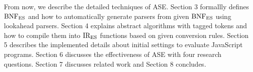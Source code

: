 From now, we describe the detailed techniques of ASE.
Section 3 formallly defines \( \text{BNF}_{\text{ES}} \) and how to automatically
generate parsers from given \( \text{BNF}_{\text{ES}} \) using lookahead parsers.
Section 4 explains abstract algorithms with tagged tokens
and how to compile them into \( \text{IR}_\text{ES} \) functions based on
given conversion rules. Section 5 describes the implemented details
about initial settings to evaluate JavaScript programs. Section 6
discusses the effectiveness of ASE with four research questions.
Section 7 discusses related work and Section 8 concludes.
